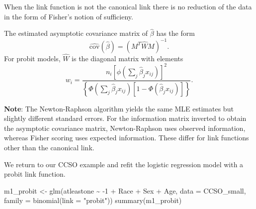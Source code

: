 \documentclass[
  ignorenonframetext,
]{beamer}
\newenvironment{Shaded}{\begin{snugshade}}{\end{snugshade}}
\newcommand{\AttributeTok}[1]{\textcolor[rgb]{0.77,0.63,0.00}{#1}}
\newcommand{\DecValTok}[1]{\textcolor[rgb]{0.00,0.00,0.81}{#1}}
\newcommand{\FunctionTok}[1]{\textcolor[rgb]{0.00,0.00,0.00}{#1}}
\newcommand{\NormalTok}[1]{#1}
\newcommand{\OtherTok}[1]{\textcolor[rgb]{0.56,0.35,0.01}{#1}}
\newcommand{\SpecialCharTok}[1]{\textcolor[rgb]{0.00,0.00,0.00}{#1}}
\newcommand{\StringTok}[1]{\textcolor[rgb]{0.31,0.60,0.02}{#1}}
\begin{document}
\begin{frame}[fragile]{}
\protect\hypertarget{section-10}{}
When the link function is not the canonical link there is no reduction
of the data in the form of Fisher's notion of sufficieny.

\vspace{12pt}

The estimated asymptotic covariance matrix of \(\hat\beta\) has the form
\[
  \widehat{\text{cov}}(\hat\beta) = \left(M^T\widehat{W}M\right)^{-1}.
\] For probit models, \(\widehat{W}\) is the diagonal matrix with
elements \[
  w_i =\frac{n_i\left[\phi\left(\sum_j\hat\beta_j x_{ij}\right)\right]^2}
  {\left\{\Phi\left(\sum_j\hat\beta_j x_{ij}\right)\left[1 - \Phi\left(\hat\beta_j x_{ij}\right)\right]\right\}}.
\]

\vspace{12pt}

\textbf{Note}: The Newton-Raphson algorithm yields the same MLE
estimates but slightly different standard errors. For the information
matrix inverted to obtain the asymptotic covariance matrix,
Newton-Raphson uses observed information, whereas Fisher scoring uses
expected information. These differ for link functions other than the
canonical link.

\vspace{12pt}

We return to our CCSO example and refit the logistic regression model
with a probit link function.

\tiny

\begin{Shaded}
\begin{Highlighting}[]
\NormalTok{m1\_probit }\OtherTok{\textless{}{-}} \FunctionTok{glm}\NormalTok{(atleastone }\SpecialCharTok{\textasciitilde{}} \SpecialCharTok{{-}}\DecValTok{1} \SpecialCharTok{+}\NormalTok{ Race }\SpecialCharTok{+}\NormalTok{ Sex }\SpecialCharTok{+}\NormalTok{ Age, }\AttributeTok{data =}\NormalTok{ CCSO\_small, }
          \AttributeTok{family =} \FunctionTok{binomial}\NormalTok{(}\AttributeTok{link =} \StringTok{"probit"}\NormalTok{))}
\FunctionTok{summary}\NormalTok{(m1\_probit)}
\end{Highlighting}
\end{Shaded}


\end{frame}
\end{document}
